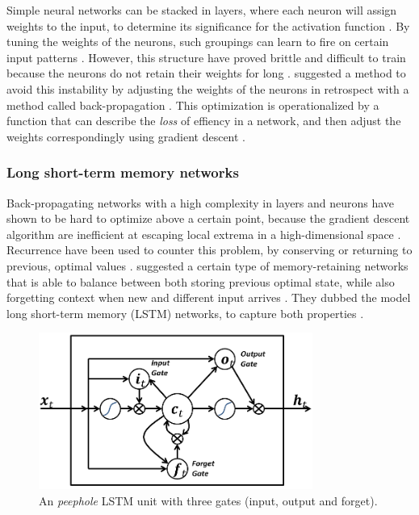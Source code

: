 \documentclass[a4paper]{article}
\begin{document}
Simple neural networks can be stacked in layers, where each neuron will assign
weights to the input, to determine its significance for the activation function
\citep{NILSSON2009}. By tuning the weights of the neurons, such groupings can
learn to fire on certain input patterns \citep{Russell2009}. However,
this structure have proved brittle and difficult to train because the
neurons do not retain their weights for long \citep{NILSSON2009, Russell2009}.
\cite{Rumelhart1988} suggested a method to avoid this instability by adjusting
the weights of the neurons in retrospect with a method called back-propagation
\citep{Rumelhart1988, NILSSON2009}. This optimization is
operationalized by a function that can describe the \textit{loss} of effiency
in a network, and then adjust the weights correspondingly using gradient
descent \citep{Russell2009}.

\subsubsection{Long short-term memory networks}
Back-propagating networks with a high complexity in layers and neurons have
shown to be hard to optimize above a certain point, because the gradient
descent algorithm are inefficient at escaping local extrema in a high-dimensional
space \citep{Russell2009}. Recurrence have been used to counter this problem,
by conserving \emdash or returning to \emdash previous, optimal values
\citep{Schmidhuber2015, Russell2009}. \cite{Hochreiter1997} suggested a certain
type of memory-retaining networks that is able to balance between both
storing previous optimal state, while also forgetting context when new and
different input arrives \citep{Hochreiter1997, Schmidhuber2015}.
They dubbed the model long short-term memory (LSTM) networks, to capture both
properties \citep{Hochreiter1997}.

\begin{figure}
  \centering
  \includegraphics[width=0.8\textwidth]{lstm.png}
  \caption{An \textit{peephole} LSTM unit with three gates (input, output and forget).}
  \label{fig:lstm}
\end{figure}
\end{document}
